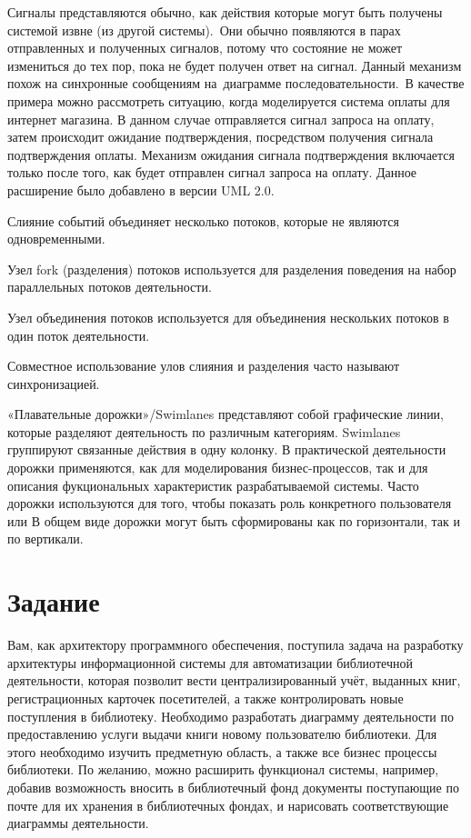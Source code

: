 Сигналы представляются обычно, как действия которые могут быть получены системой извне (из другой системы). Они обычно появляются в парах отправленных и полученных сигналов, потому что состояние не может измениться до тех пор, пока не будет получен ответ на сигнал. Данный механизм похож на синхронные сообщениям на диаграмме последовательности. В качестве примера можно рассмотреть ситуацию, когда моделируется система оплаты для интернет магазина. В данном случае отправляется сигнал запроса на оплату, затем происходит ожидание подтверждения, посредством получения сигнала подтверждения оплаты. Механизм ожидания сигнала подтверждения включается только после того, как будет отправлен сигнал запроса на оплату. Данное расширение было добавлено в версии UML 2.0.

Слияние событий объединяет несколько потоков, которые не являются одновременными.

Узел fork (разделения) потоков используется для разделения поведения на набор параллельных потоков деятельности.

Узел объединения потоков используется для объединения нескольких потоков в один поток деятельности.

Совместное использование улов слияния и разделения часто называют синхронизацией.

«Плавательные дорожки»/Swimlanes представляют собой графические линии, которые разделяют деятельность по различным категориям. Swimlanes группируют связанные действия в одну колонку. В практической деятельности дорожки применяются, как для моделирования бизнес-процессов, так и для описания фукциональных характеристик разрабатываемой системы. Часто дорожки используются для того, чтобы показать роль конкретного пользователя или
В общем виде дорожки могут быть сформированы как по горизонтали, так и по вертикали.

\section{Задание}

Вам, как архитектору программного обеспечения, поступила задача на разработку архитектуры информационной системы для автоматизации библиотечной деятельности, которая позволит вести централизированный учёт, выданных книг, регистрационных карточек посетителей, а также контролировать новые поступления в библиотеку. Необходимо разработать диаграмму деятельности по предоставлению услуги выдачи книги новому пользователю библиотеки. Для этого необходимо изучить предметную область, а также все бизнес процессы библиотеки. По желанию, можно расширить функционал системы, например, добавив возможность вносить в библиотечный фонд документы поступающие по почте для их хранения в библиотечных фондах, и нарисовать соответствующие диаграммы деятельности.
